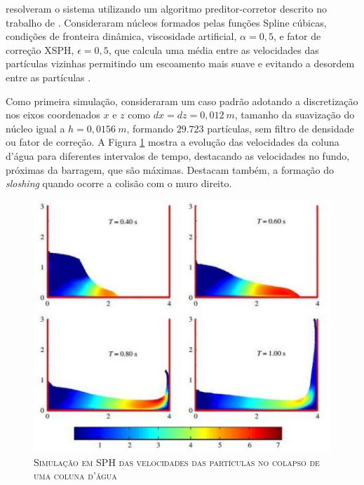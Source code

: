  resolveram o sistema utilizando um algoritmo preditor-corretor descrito no trabalho de . Consideraram núcleos formados pelas funções Spline cúbicas, condições de fronteira dinâmica, viscosidade artificial, $\alpha = 0,5$, e fator de correção XSPH, $\epsilon = 0,5$, que calcula uma média entre as velocidades das partículas vizinhas permitindo um escoamento mais suave e evitando a desordem entre as partículas \cite{Paiva2009}.

Como primeira simulação, consideraram um caso padrão adotando a discretização nos eixos coordenados $x$ e $z$ como $dx=dz=0,012 \ m$, tamanho da suavização do núcleo igual a $h=0,0156 \ m$, formando $29.723$ partículas, sem filtro de densidade ou fator de correção. A Figura \ref{fig:colapso} mostra a evolução das velocidades da coluna d'água para diferentes intervalos de tempo, destacando as velocidades no fundo, próximas da barragem, que são máximas. Destacam também, a formação do \textit{sloshing} quando ocorre a colisão com o muro direito.

\begin{figure}[H]
\begin{center}
\includegraphics[scale=1]{figuras/colapso.jpg}
\end{center}
\caption{\textsc{Simulação em SPH das velocidades das partículas no colapso de uma coluna d'água}}
\vspace{-0.1cm}
\label{fig:colapso}
\end{figure}   

